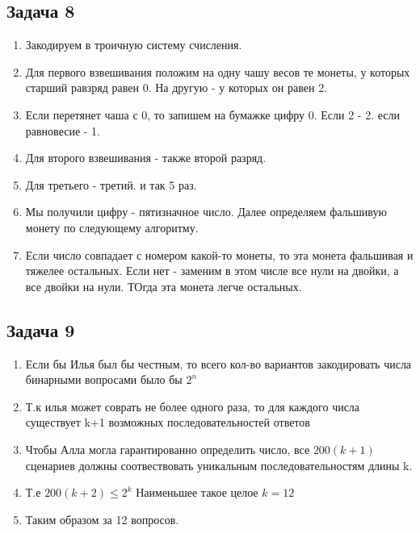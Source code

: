 \documentclass[a4paper,12pt]{article}
\begin{document}
\subsection{Задача 8}
\begin{enumerate}
    \item Закодируем в троичную систему счисления.
    \item Для первого взвешивания положим на одну чашу весов те монеты, у которых старший равзряд равен 0. На другую - у которых он равен 2.
    \item Если перетянет чаша с 0, то запишем на бумажке цифру 0. Если 2 - 2. если равновесие - 1.
    \item Для второго взвешивания - также второй разряд.
    \item Для третьего - третий. и так 5 раз.
    \item Мы получили цифру - пятизначное число. Далее определяем фальшивую монету по следующему алгоритму.
    \item Если число совпадает с номером какой-то монеты, то эта монета фальшивая и тяжелее остальных. Если нет - заменим в этом числе все нули на двойки, а все двойки на нули. ТОгда эта монета легче остальных.
\end{enumerate}


\subsection{Задача 9}

\begin{enumerate}
    \item Если бы Илья был бы честным, то всего кол-во вариантов закодировать числа бинарными вопросами было бы $2^n$
    \item Т.к илья может соврать не более одного раза, то для каждого числа существует k+1 возможных последовательностей ответов
    \item Чтобы Алла могла гарантированно определить число, все $200(k+1)$ сценариев должны соотвествовать уникальным последовательностям длины k.
    \item Т.е $200(k+2)\le 2^k$ Наименьшее такое целое $k=12 $
    \item Таким образом за 12 вопросов.
\end{enumerate}
\end{document}
